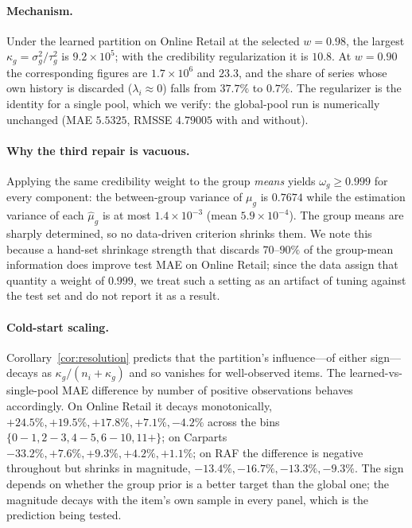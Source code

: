 \documentclass[twocolumn,10pt]{article}
\begin{document}
\paragraph{Mechanism.} Under the learned partition on Online Retail at
the selected $w=0.98$, the largest $\kappa_g=\sigma_g^2/\tau_g^2$ is
$9.2\times10^{5}$; with the credibility regularization it is $10.8$. At
$w=0.90$ the corresponding figures are $1.7\times10^{6}$ and $23.3$, and
the share of series whose own history is discarded
($\lambda_i\approx0$) falls from $37.7\%$ to $0.7\%$. The regularizer is
the identity for a single pool, which we verify: the global-pool run is
numerically unchanged (MAE $5.5325$, RMSSE $4.79005$ with and without).

\paragraph{Why the third repair is vacuous.} Applying the same
credibility weight to the group \emph{means} yields $\omega_g\ge0.999$
for every component: the between-group variance of $\mu_g$ is $0.7674$
while the estimation variance of each $\hat\mu_g$ is at most
$1.4\times10^{-3}$ (mean $5.9\times10^{-4}$). The group means are
sharply determined, so no data-driven criterion shrinks them. We note
this because a hand-set shrinkage strength that discards $70$--$90\%$ of
the group-mean information does improve test MAE on Online Retail; since
the data assign that quantity a weight of $0.999$, we treat such a
setting as an artifact of tuning against the test set and do not report
it as a result.

\paragraph{Cold-start scaling.} Corollary~\ref{cor:resolution} predicts
that the partition's influence---of either sign---decays as
$\kappa_g/(n_i+\kappa_g)$ and so vanishes for well-observed items. The
learned-vs-single-pool MAE difference by number of positive observations
behaves accordingly. On Online Retail it decays monotonically,
$+24.5\%,+19.5\%,+17.8\%,+7.1\%,-4.2\%$ across the bins
$\{0\!-\!1,2\!-\!3,4\!-\!5,6\!-\!10,11+\}$; on Carparts
$-33.2\%,+7.6\%,+9.3\%,+4.2\%,+1.1\%$; on RAF the difference is negative
throughout but shrinks in magnitude, $-13.4\%,-16.7\%,-13.3\%,-9.3\%$.
The sign depends on whether the group prior is a better target than the
global one; the magnitude decays with the item's own sample in every
panel, which is the prediction being tested.
\end{document}
